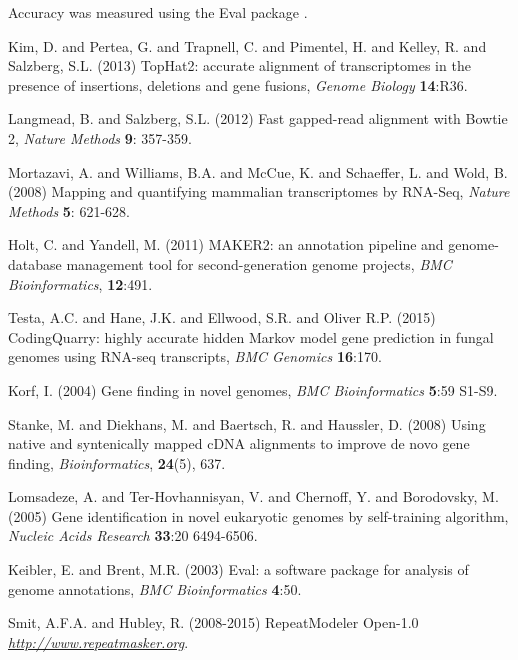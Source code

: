 \documentclass[a4paper,10pt]{report}
\begin{document}
Accuracy was measured using the Eval package \cite{Eval}.



\begin{thebibliography}{}
 Kim, D. and Pertea, G. and Trapnell, C. and Pimentel, H. and Kelley, R. and Salzberg, S.L. (2013) TopHat2: accurate alignment of transcriptomes in the presence of insertions, deletions and gene fusions, {\it Genome Biology} \textbf{14}:R36.

 Langmead, B. and Salzberg, S.L. (2012) Fast gapped-read alignment with Bowtie 2, \textit{Nature Methods} \textbf{9}: 357-359.

 Mortazavi, A. and Williams, B.A. and McCue, K. and Schaeffer, L. and Wold, B. (2008) Mapping and quantifying mammalian transcriptomes by RNA-Seq, \textit{Nature Methods} \textbf{5}: 621-628.

 Holt, C. and Yandell, M. (2011) MAKER2: an annotation pipeline and genome-database management tool for second-generation genome projects, \textit{BMC Bioinformatics}, \textbf{12}:491.

 Testa, A.C. and Hane, J.K. and Ellwood, S.R. and Oliver R.P. (2015) CodingQuarry: highly accurate hidden Markov model gene prediction in fungal genomes using RNA-seq transcripts, \textit{BMC Genomics} \textbf{16}:170.

 Korf, I. (2004) Gene finding in novel genomes, \textit{BMC Bioinformatics} \textbf{5}:59 S1-S9.

Stanke, M. and Diekhans, M. and Baertsch, R. and Haussler, D. (2008) Using native and syntenically mapped cDNA alignments to improve de novo gene finding, \textit{Bioinformatics}, \textbf{24}(5), 637.

 Lomsadeze, A. and Ter-Hovhannisyan, V. and Chernoff, Y. and Borodovsky, M. (2005) Gene identification in novel eukaryotic genomes by self-training algorithm, \textit{Nucleic Acids Research} \textbf{33}:20 6494-6506.

 Keibler, E. and Brent, M.R. (2003) Eval: a software package for analysis of genome annotations, \textit{BMC Bioinformatics} \textbf{4}:50.

 Smit, A.F.A. and Hubley, R. (2008-2015) RepeatModeler Open-1.0 \textit{\url{http://www.repeatmasker.org}}.

\end{thebibliography}
\end{document}
